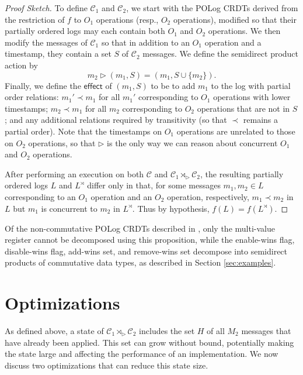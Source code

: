 \documentclass[acmsmall,nonacm,12pt]{acmart}
\newcommand{\mc}[1]{\ensuremath{\mathcal{#1}}}
\newcommand{\msf}[1]{\ensuremath{\mathsf{#1}}}
\newcommand{\act}{\triangleright}
\theoremstyle{plain}
\theoremstyle{definition}
\begin{document}
\begin{proof}[Proof Sketch]
To define $\mc{C}_1$ and $\mc{C}_2$, we start with the POLog CRDTs derived from the restriction of $f$ to $O_1$ operations (resp., $O_2$ operations), modified so that their partially ordered logs may each contain both $O_1$ and $O_2$ operations.  We then modify the messages of $\mc{C}_1$ so that in addition to an $O_1$ operation and a timestamp, they contain a set $S$ of $\mc{C}_2$ messages.  We define the semidirect product action by
\[
m_2 \act (m_1, S) = (m_1, S \cup \{m_2\}).
\]
Finally, we define the $\msf{effect}$ of $(m_1, S)$ to be to add $m_1$ to the log with partial order relations: $m_1' \prec m_1$ for all $m_1'$ corresponding to $O_1$ operations with lower timestamps; $m_2 \prec m_1$ for all $m_2$ corresponding to $O_2$ operations that are not in $S$; and any additional relations required by transitivity (so that $\prec$ remains a partial order).  Note that the timestamps on $O_1$ operations are unrelated to those on $O_2$ operations, so that $\act$ is the only way we can reason about concurrent $O_1$ and $O_2$ operations.

After performing an execution on both $\mc{C}$ and $\mc{C}_1 \rtimes_\act \mc{C}_2$, the resulting partially ordered logs $L$ and $L^\rtimes$ differ only in that, for some messages $m_1, m_2 \in L$ corresponding to an $O_1$ operation and an $O_2$ operation, respectively, $m_1 \prec m_2$ in $L$ but $m_1$ is concurrent to $m_2$ in $L^\rtimes$.  Thus by hypothesis, $f(L) = f(L^\rtimes)$.
\end{proof}

Of the non-commutative POLog CRDTs described in \cite{pure_op_based_crdts_extended}, only the multi-value register cannot be decomposed using this proposition, while the enable-wins flag, disable-wins flag, add-wins set, and remove-wins set decompose into semidirect products of commutative data types, as described in Section \ref{sec:examples}.





\section{Optimizations}
\label{sec:optimizations}
As defined above, a state of $\mc{C}_1 \rtimes_\act \mc{C}_2$ includes the set $H$ of all $M_2$ messages that have already been applied.  This set can grow without bound, potentially making the state large and affecting the performance of an implementation.  We now discuss two optimizations that can reduce this state size.
\end{document}
